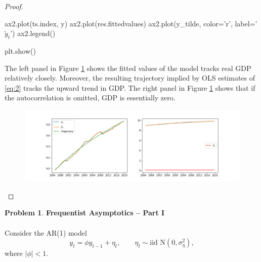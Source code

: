 \documentclass[oneside,reqno]{amsart}
\theoremstyle{definition}
\newtheorem{prob}{Problem}
\begin{document}
\begin{enumerate}
\begin{proof}
\begin{python3code}
ax2.plot(ts.index, y)
ax2.plot(res.fittedvalues)
ax2.plot(y_tilde, color='r', label='$\tilde y_t$')
ax2.legend()

plt.show()
\end{python3code}

The left panel in Figure \ref{q1-fig} shows the fitted values of the model tracks real GDP relatively closely. Moreover, the resulting trajectory implied by OLS estimates of \eqref{eq:2} tracks the upward trend in GDP. The right panel in Figure \ref{q1-fig} shows that if the autocorrelation is omitted, GDP is essentially zero. 

\begin{figure}[!h]
\includegraphics[width=\textwidth]{q1-fig}
\caption{}
\label{q1-fig}
\end{figure}
\end{proof}

\end{enumerate}

\begin{prob}
\textbf{Frequentist Asymptotics -- Part I}
\\ \\
Consider the AR(1) model 
\[
	y_t = \phi y_{t-1} + \eta_t, \qquad \eta_t \sim \text{iid N}(0, \sigma_\eta^2),
\]
where $|\phi| <1$.
\end{prob}
\end{document}
